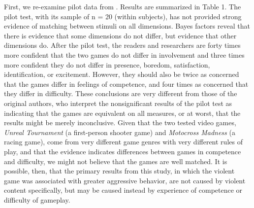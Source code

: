 \documentclass[fignum,nobf,man]{apa}
\begin{document}
First, we re-examine pilot data from \citet{Arriaga:etal:2008}. Results are summarized in Table 1. The pilot test, with its sample of n = 20 (within subjects), has not provided strong evidence of matching between stimuli on all dimensions. Bayes factors reveal that there is evidence that some dimensions do not differ, but evidence that other dimensions do. After the pilot test, the readers and researchers %
are forty times more confident that the two games do not differ in involvement and three times more confident they do not differ in presence, boredom, satisfaction, identification, or excitement. However, they should also be twice as concerned that the games differ in feelings of competence, and four times as concerned that they differ in difficulty. These conclusions are very different from those of the original authors, who interpret the nonsignificant results of the pilot test as indicating that the games are equivalent on all measures, or at worst, that the results might be merely inconclusive. Given that the two tested video games, {\em Unreal Tournament} (a first-person shooter game) and {\em Motocross Madness} (a racing game), come from very different game genres with very different rules of play, and that the evidence indicates differences between games in competence and difficulty, we might not believe that the games are well matched.  It is possible, then, that the primary results from this study, in which the violent game was associated with greater aggressive behavior, %
are not caused by violent content specifically, but may be caused instead by experience of competence or difficulty of gameplay.
\end{document}
